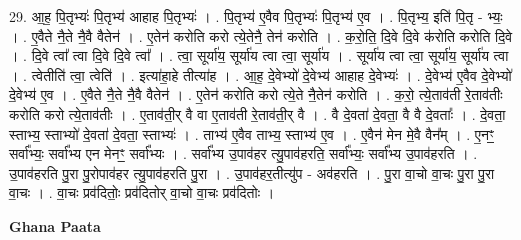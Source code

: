 \documentclass[17pt]{extarticle}
\begin{document}
29. आ॒ह॒ पि॒तृभ्यः॑ पि॒तृभ्य॑ आहाह पि॒तृभ्यः॑ । . पि॒तृभ्य॑ ए॒वैव पि॒तृभ्यः॑ पि॒तृभ्य॑ ए॒व । . पि॒तृभ्य॒ इति॑ पि॒तृ - भ्यः॒ । . ए॒वैते नै॒ते नै॒वै वैतेन॑ । . ए॒तेन॑ करोति करो त्ये॒तेनै॒ तेन॑ करोति । . क॒रो॒ति॒ दि॒वे दि॒वे क॑रोति करोति दि॒वे । . दि॒वे त्वा᳚ त्वा दि॒वे दि॒वे त्वा᳚ । . त्वा॒ सूर्या॑य॒ सूर्या॑य त्वा त्वा॒ सूर्या॑य । . सूर्या॑य त्वा त्वा॒ सूर्या॑य॒ सूर्या॑य त्वा । . त्वेतीति॑ त्वा॒ त्वेति॑ । . इत्या॑हा॒हे तीत्या॑ह । . आ॒ह॒ दे॒वेभ्यो॑ दे॒वेभ्य॑ आहाह दे॒वेभ्यः॑ । . दे॒वेभ्य॑ ए॒वैव दे॒वेभ्यो॑ दे॒वेभ्य॑ ए॒व । . ए॒वैते नै॒ते नै॒वै वैतेन॑ । . ए॒तेन॑ करोति करो त्ये॒ते नै॒तेन॑ करोति । . क॒रो॒ त्ये॒ताव॑ती रे॒ताव॑तीः करोति करो त्ये॒ताव॑तीः । . ए॒ताव॑ती॒र् वै वा ए॒ताव॑ती रे॒ताव॑ती॒र् वै । . वै दे॒वता॑ दे॒वता॒ वै वै दे॒वताः᳚ । . दे॒वता॒ स्ताभ्य॒ स्ताभ्यो॑ दे॒वता॑ दे॒वता॒ स्ताभ्यः॑ । . ताभ्य॑ ए॒वैव ताभ्य॒ स्ताभ्य॑ ए॒व । . ए॒वैन॑ मेन मे॒वै वैन᳚म् । . ए॒नꣳ॒॒ सर्वा᳚भ्यः॒ सर्वा᳚भ्य एन मेनꣳ॒॒ सर्वा᳚भ्यः । . सर्वा᳚भ्य उ॒पाव॑हर त्यु॒पाव॑हरति॒ सर्वा᳚भ्यः॒ सर्वा᳚भ्य उ॒पाव॑हरति । . उ॒पाव॑हरति पु॒रा पु॒रोपाव॑हर त्यु॒पाव॑हरति पु॒रा । . उ॒पाव॑हर॒तीत्यु॑प - अव॑हरति । . पु॒रा वा॒चो वा॒चः पु॒रा पु॒रा वा॒चः । . वा॒चः प्रव॑दितोः॒ प्रव॑दितोर् वा॒चो वा॒चः प्रव॑दितोः । \newline

\textbf{Ghana Paata } \newline
\end{document}
